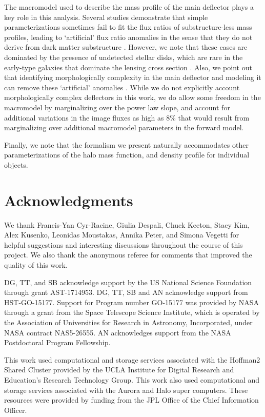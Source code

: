 The macromodel used to describe the mass profile of the main deflector plays a key role in this analysis. Several studies demonstrate that simple parameterizations sometimes fail to fit the flux ratios of substructure-less mass profiles, leading to `artificial' flux ratio anomalies in the sense that they do not derive from dark matter substructure \cite{Gilman++17,Hsueh++18}. However, we note that these cases are dominated by the presence of undetected stellar disks, which are rare in the early-type galaxies that dominate the lensing cross section \cite{Auger++10,Shankar++17}. Also, we point out that identifying morphologically complexity in the main deflector and modeling it can remove these `artificial' anomalies \cite{Hsueh++16}. While we do not explicitly account morphologically complex deflectors in this work, we do allow some freedom in the macromodel by marginalizing over the power law slope, and account for additional variations in the image fluxes as high as $8\%$ that would result from marginalizing over additional macromodel parameters in the forward model. 

Finally, we note that the formalism we present naturally accommodates other parameterizations of the halo mass function, and density profile for individual objects. 

\section*{Acknowledgments}
We thank Francis-Yan Cyr-Racine, Giulia Despali, Chuck Keeton, Stacy Kim, Alex Kusenko, Leonidas Moustakas, Annika Peter, and Simona Vegetti for helpful suggestions and interesting discussions throughout the course of this project. We also thank the anonymous referee for comments that improved the quality of this work. 

DG, TT, and SB acknowledge support by the US National Science Foundation through grant AST-1714953. DG, TT, SB and AN acknowledge support from HST-GO-15177. Support for Program number GO-15177 was provided by NASA through a grant from the Space Telescope Science Institute, which is operated by the Association of Universities for Research in Astronomy, Incorporated, under NASA contract NAS5-26555. AN acknowledges support from the NASA Postdoctoral Program Fellowship. 

This work used computational and storage services associated with the Hoffman2 Shared Cluster provided by the UCLA Institute for Digital Research and Education's Research Technology Group. This work also used computational and storage services associated with the Aurora and Halo super computers. These resources were provided by funding from the JPL Office of the Chief Information Officer. 

